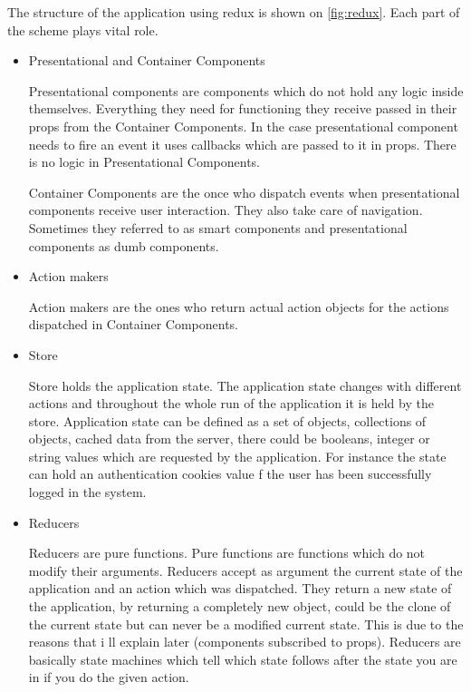 \documentclass[thesis=M,english]{FITthesis}[2012/10/20]
\begin{document}
The structure of the application using redux is shown on \ref{fig:redux}. Each part of the scheme plays vital role.
\begin{itemize}
\item{Presentational and Container Components}

Presentational components are components which do not hold any logic inside themselves. Everything they need for functioning they receive passed in their props from the Container Components. In the case presentational component needs to fire an event it uses callbacks which are passed to it in props. There is no logic in Presentational Components.


Container Components are the once who dispatch events when presentational components receive user interaction. They also take care of navigation. Sometimes they referred to as smart components and presentational components as dumb components.

\item{Action makers}

Action makers are the ones who return actual action objects for the actions dispatched in Container Components.

\item{Store}

Store holds the application state. The application state changes with different actions and throughout the whole run of the application it is held by the store. Application state can be defined as a set of objects, collections of objects, cached data from the server, there could be booleans, integer or string values which are requested by the application. For instance the state can hold an authentication cookies value f the user has been successfully logged in the system.

\item{Reducers}

Reducers are pure functions. Pure functions are functions which do not modify their arguments. Reducers accept as argument the current state of the application and an action which was dispatched. They return a new state of the application, by returning a completely new object, could be the clone of the current state but can never be a modified current state. This is due to the reasons that i ll explain later (components subscribed to props). Reducers are basically state machines which tell which state follows after the state you are in if you do the given action.

\end{itemize}
\end{document}

